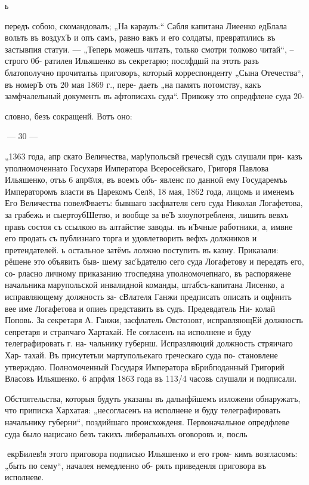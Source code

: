 ь

передъ собою, скомандовалъ; „На караулъ:“ Сабля капитана
Лиеенко едБлала вольть въ воздухЪ и опъ самъ, равно вакъ
и его солдаты, превратились въ застывпия статуи. — „Теперь
можешь читать, только смотри толково читай“, --строго 0б-
ратилея Ильяшенко въ секретарю; послфдшй па этоть разъ
блатополучно прочиталъь приговоръ, который корреспонденту
„Сына Отечества“, въ номерЪ оть 20 мая 1869 г., пере-
даеть „на память потомству, какъ замфчалельный документь
въ афтописахь суда“. Привожу это опредфлене суда 20-

словно, безъ сокращенй. Вотъ оно:

— 30 —

„1363 года, апр%
скато Величества, мар!упольсвй гречесвй судъ слушали при-
казъ уполномоченнато Госухаря Императора Всеросейскаго,
Григоря Павлова Ильяшенко, отъь 6 апр®ля, въ воемъ объ-
явленс по данной ему Государемъь Императоромъ власти въ
Царекомъ Сел8, 18 мая, 1862 года, лицомь и именемъ
Его Величества повелФваетъ: бывшаго засфяателя сего суда
Николая Логафетова, за грабежь и сыертоубШетво, и вообще
за веЪ злоупотребленя, лишить вевхъ правъ состоя съ
ссылкою въ алтайстие заводы. въ иЪчные работники, а, имвне
его продать съ публизнаго торга и удовлетворить вефхъ
должников и претендателей. ь остальное затёмъ лолжно
поступить въ казну. Приказали: рёшене это объявить быв-
шему засЪдателю сего суда Логафетову и передать его, со-
рласно личному приказанию тгоспедяна уполномочепнаго, въ
распоряжене начальника марупольской инвалидной команды,
штабсъ-капитана Лисенко, а исправляющему должность за-
сВлателя Ганжи предписать описать и оцфнить вее име
Логафетова и опиеь представить въ судъ. Предевдатель Ни-
колай Поповь. За секретаря А. Ганжи, засфлатель Овстозовт,
исправляющЕй должность сепретаря и страпчаго Хартахай.
Не согласенъ на исполнене и буду телеграфировать г. на-
чальнику губернш. Испразляюций должность стряичаго Хар-
тахай. Въ присутетыи мартупольекаго греческаго суда по-
становлене утверждаю. Полномоченный Государя Императора
вБрибподанный Григорий Власовъ Ильяшенко. 6 апрфля 1863
года въ 113/4 часовь слушали и подписали.

Обстоятельства, которыя будуть указаны въ дальнфйшемъ
изложени обнаружатъ, что приписка Хархатая: „несогласенъ
на исполнене и буду телеграфировать начальнику губерни“,
поздийшаго происхожденя. Первоначальное опредфлеве суда
было нацисано безъ такихъ либеральныхъ оговоровъ и, посль

екрБилев!я этого приговора подписью Ильяшенко и его гром-
кимъ возгласомъ: „быть по сему“, началея немедленно об-
рялъ приведенля приговора въ исполневе.

